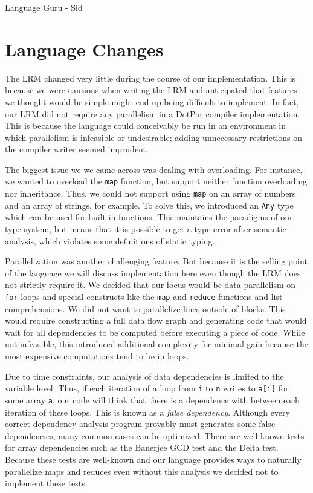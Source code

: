 Language Guru - Sid

\section{Language Changes}
The LRM changed very little during the course of our implementation. This is
because we were cautious when writing the LRM and anticipated that features we
thought would be simple might end up being difficult to implement. In fact, our
LRM did not require any parallelism in a DotPar compiler implementation. This is
because the language could conceivably be run in an environment in which
parallelism is infeasible or undesirable; adding unnecessary restrictions on the
compiler writer seemed imprudent.

The biggest issue we we came across was dealing with overloading. For instance,
we wanted to overload the \verb$map$ function, but support neither function
overloading nor inheritance. Thus, we could not support using \verb$map$ on an
array of numbers and an array of strings, for example. To solve this, we
introduced an \verb$Any$ type which can be used for built-in functions. This
maintains the paradigms of our type system, but means that it is possible to get
a type error after semantic analysis, which violates some definitions of static
typing.

Parallelization was another challenging feature. But because it is the selling
point of the language we will discuss implementation here even though the LRM
does not strictly require it. We decided that our focus would be data
parallelism on \verb$for$ loops and special constructs like the \verb$map$ and
\verb$reduce$ functions and list comprehensions. We did not want to parallelize
lines outside of blocks. This would require constructing a full data flow graph
and generating code that would wait for all dependencies to be computed
before executing a piece of code. While not infeasible, this introduced
additional complexity for minimal gain because the most expensive computations
tend to be in loops.

Due to time constraints, our analysis of data dependencies is limited to the
variable level. Thus, if each iteration of a loop from \verb$i$ to \verb$n$
writes to \verb$a[i]$ for some array \verb$a$, our code will think that there is
a dependence with between each iteration of these loops. This is known as a
\emph{false dependency}. Although every correct dependency analysis program
provably must generates some false dependencies, many common cases can be
optimized. There are well-known tests for array dependencies such as the
Banerjee GCD test and the Delta test. Because these tests are well-known and our
language provides ways to naturally parallelize maps and reduces even without
this analysis we decided not to implement these tests.

